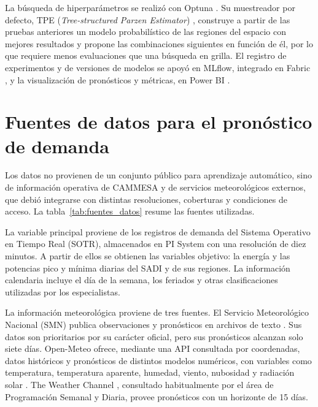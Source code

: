 La búsqueda de hiperparámetros se realizó con Optuna \cite{akiba2019optuna}. Su muestreador por defecto, TPE (\textit{Tree-structured Parzen Estimator}) \cite{bergstra2011tpe}, construye a partir de las pruebas anteriores un modelo probabilístico de las regiones del espacio con mejores resultados y propone las combinaciones siguientes en función de él, por lo que requiere menos evaluaciones que una búsqueda en grilla. El registro de experimentos y de versiones de modelos se apoyó en MLflow, integrado en Fabric \cite{microsoftFabricMLflow}, y la visualización de pronósticos y métricas, en Power BI \cite{microsoftPowerBI}.

\section{Fuentes de datos para el pronóstico de demanda}
\label{sec:datasets}

Los datos no provienen de un conjunto público para aprendizaje automático, sino de información operativa de CAMMESA y de servicios meteorológicos externos, que debió integrarse con distintas resoluciones, coberturas y condiciones de acceso. La tabla~\ref{tab:fuentes_datos} resume las fuentes utilizadas.

La variable principal proviene de los registros de demanda del Sistema Operativo en Tiempo Real (SOTR), almacenados en PI System con una resolución de diez minutos. A partir de ellos se obtienen las variables objetivo: la energía y las potencias pico y mínima diarias del SADI y de sus regiones. La información calendaria incluye el día de la semana, los feriados y otras clasificaciones utilizadas por los especialistas.

La información meteorológica proviene de tres fuentes. El Servicio Meteorológico Nacional (SMN) publica observaciones y pronósticos en archivos de texto \cite{datosabiertosSMN}. Sus datos son prioritarios por su carácter oficial, pero sus pronósticos alcanzan solo siete días. Open-Meteo ofrece, mediante una API consultada por coordenadas, datos históricos y pronósticos de distintos modelos numéricos, con variables como temperatura, temperatura aparente, humedad, viento, nubosidad y radiación solar \cite{openMeteoHistorical,openMeteoForecast}. The Weather Channel \cite{weatherWeb}, consultado habitualmente por el área de Programación Semanal y Diaria, provee pronósticos con un horizonte de 15 días.

